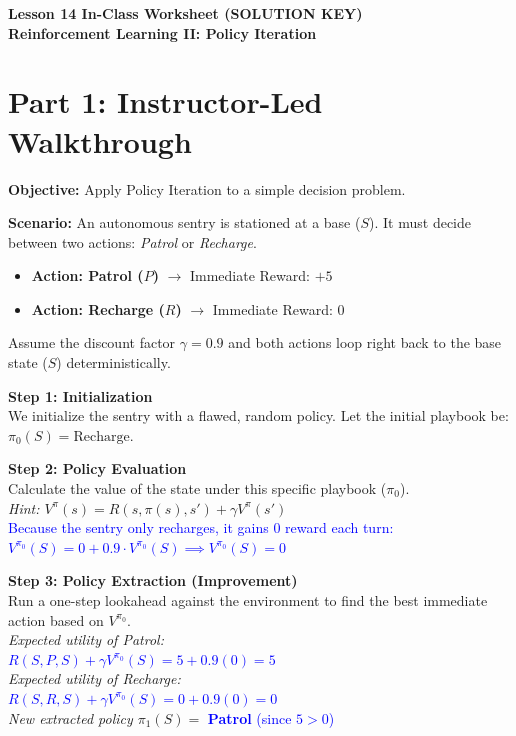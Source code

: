\documentclass[12pt]{article}
\begin{document}
\begin{center}
    \LARGE \textbf{Lesson 14 In-Class Worksheet (SOLUTION KEY)}\\
    \Large \textbf{Reinforcement Learning II: Policy Iteration}
\end{center}
\vspace{0.5cm}

\section*{Part 1: Instructor-Led Walkthrough}
\textbf{Objective:} Apply Policy Iteration to a simple decision problem.

\noindent \textbf{Scenario:} An autonomous sentry is stationed at a base ($S$). It must decide between two actions: \textit{Patrol} or \textit{Recharge}.
\begin{itemize}
    \item \textbf{Action: Patrol ($P$)} $\rightarrow$ Immediate Reward: $+5$
    \item \textbf{Action: Recharge ($R$)} $\rightarrow$ Immediate Reward: $0$
\end{itemize}
\noindent Assume the discount factor $\gamma = 0.9$ and both actions loop right back to the base state ($S$) deterministically.

\vspace{0.5cm}
\noindent \textbf{Step 1: Initialization}\\
We initialize the sentry with a flawed, random policy. Let the initial playbook be:\\
$\pi_0(S) = \text{Recharge}$.
\vspace{0.5cm}

\noindent \textbf{Step 2: Policy Evaluation}\\
Calculate the value of the state under this specific playbook ($\pi_0$).\\
\textit{Hint: $V^{\pi}(s) = R(s, \pi(s), s') + \gamma V^{\pi}(s')$}\\
\textcolor{blue}{Because the sentry only recharges, it gains 0 reward each turn:\\
$V^{\pi_0}(S) = 0 + 0.9 \cdot V^{\pi_0}(S) \implies V^{\pi_0}(S) = 0$}
\vspace{0.5cm}

\noindent \textbf{Step 3: Policy Extraction (Improvement)}\\
Run a one-step lookahead against the environment to find the best immediate action based on $V^{\pi_0}$.\\
\textit{Expected utility of Patrol:}\\
\textcolor{blue}{$R(S, P, S) + \gamma V^{\pi_0}(S) = 5 + 0.9(0) = 5$}\\
\textit{Expected utility of Recharge:}\\
\textcolor{blue}{$R(S, R, S) + \gamma V^{\pi_0}(S) = 0 + 0.9(0) = 0$}\\
\textit{New extracted policy $\pi_1(S) = $} \textcolor{blue}{\textbf{Patrol} (since $5 > 0$)}
\vspace{0.5cm}
\end{document}
